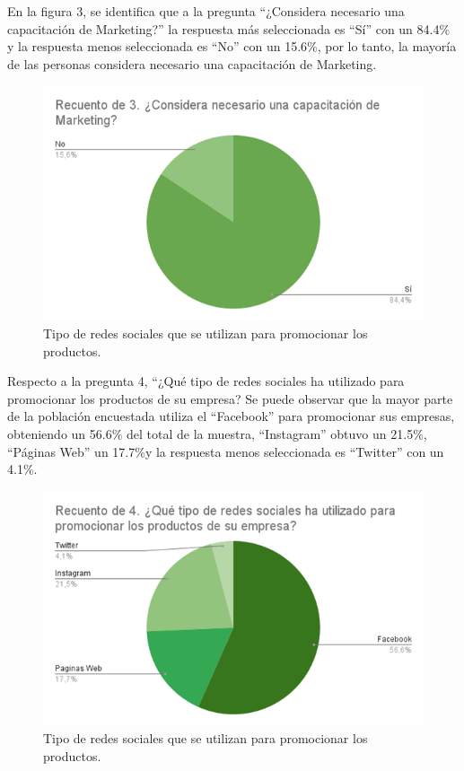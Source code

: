 \documentclass[12pt]{difu100cia} %
\begin{document}
	
En la figura 3, se identifica que a la pregunta “¿Considera necesario una capacitación de Marketing?” la respuesta más seleccionada es “Sí” con un 84.4\% y la respuesta menos seleccionada es “No” con un 15.6\%, por lo tanto, la mayoría de las personas considera necesario una capacitación de Marketing.

\begin{figure}[!htb]
	\centering
	\includegraphics[width=\linewidth]{Figura 4.png}
	\caption{Tipo de redes sociales que se utilizan para promocionar los productos.}
	\label{Figur 4}
\end{figure}
	
	
Respecto a la pregunta 4, “¿Qué tipo de redes sociales ha utilizado para promocionar los productos de su empresa?  Se puede observar que la mayor parte de la población encuestada utiliza el “Facebook” para promocionar sus empresas, obteniendo un 56.6\% del total de la muestra, “Instagram” obtuvo un 21.5\%, “Páginas Web” un 17.7\%y la respuesta menos seleccionada es “Twitter” con un 4.1\%. 


\begin{figure}[!htb]
	\centering
	\includegraphics[width=\linewidth]{Figura 5.png}
	\caption{Tipo de redes sociales que se utilizan para promocionar los productos.}
	\label{Figur 5}
\end{figure}
	
\end{document}
